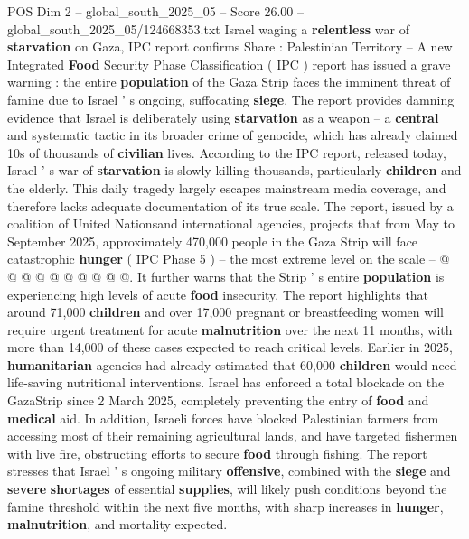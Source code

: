 \begin{textsample}{POS Dim 2 – global\_south\_2025\_05 – Score 26.00 – global\_south\_2025\_05/124668353.txt}  \label{ex:f2_pos_049}
Israel waging a \textbf{relentless} war of \textbf{starvation} on Gaza, IPC report confirms Share : Palestinian Territory -- A new Integrated \textbf{Food} Security Phase Classification ( IPC ) report has issued a grave warning : the entire \textbf{population} of the Gaza Strip faces the imminent threat of famine due to Israel ' s ongoing, suffocating \textbf{siege}.
The report provides damning evidence that Israel is deliberately using \textbf{starvation} as a weapon -- a \textbf{central} and systematic tactic in its broader crime of genocide, which has already claimed 10s of thousands of \textbf{civilian} lives.
According to the IPC report, released today, Israel ' s war of \textbf{starvation} is slowly killing thousands, particularly \textbf{children} and the elderly.
This daily tragedy largely escapes mainstream media coverage, and therefore lacks adequate documentation of its true scale.
The report, issued by a coalition of United Nationsand international agencies, projects that from May to September 2025, approximately 470,000 people in the Gaza Strip will face catastrophic \textbf{hunger} ( IPC Phase 5 ) -- the most extreme level on the scale -- @ @ @ @ @ @ @ @ @ @.
It further warns that the Strip ' s entire \textbf{population} is experiencing high levels of acute \textbf{food} insecurity.
The report highlights that around 71,000 \textbf{children} and over 17,000 pregnant or breastfeeding women will require urgent treatment for acute \textbf{malnutrition} over the next 11 months, with more than 14,000 of these cases expected to reach critical levels.
Earlier in 2025, \textbf{humanitarian} agencies had already estimated that 60,000 \textbf{children} would need life-saving nutritional interventions.
Israel has enforced a total blockade on the GazaStrip since 2 March 2025, completely preventing the entry of \textbf{food} and \textbf{medical} aid.
In addition, Israeli forces have blocked Palestinian farmers from accessing most of their remaining agricultural lands, and have targeted fishermen with live fire, obstructing efforts to secure \textbf{food} through fishing.
The report stresses that Israel ' s ongoing military \textbf{offensive}, combined with the \textbf{siege} and \textbf{severe} \textbf{shortages} of essential \textbf{supplies}, will likely push conditions beyond the famine threshold within the next five months, with sharp increases in \textbf{hunger}, \textbf{malnutrition}, and mortality expected.

\end{textsample}
